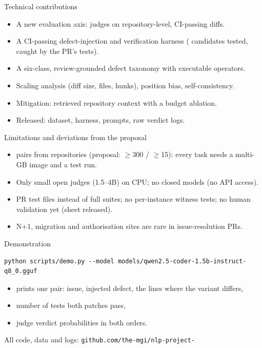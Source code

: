 \documentclass[10pt,aspectratio=169]{beamer}
\begin{document}
\begin{frame}{Technical contributions}
\begin{itemize}
  \item A new evaluation axis: judges on \alert{repository-level, CI-passing} diffs.
  \item A CI-passing defect-injection and verification harness (\NCandidates{} candidates tested, \TestCatchRate{} caught by the PR's tests).
  \item A six-class, review-grounded defect taxonomy with executable operators.
  \item Scaling analysis (diff size, files, hunks), position bias, self-consistency.
  \item Mitigation: retrieved repository context with a budget ablation.
  \item Released: dataset, harness, prompts, raw verdict logs.
\end{itemize}
\end{frame}



\begin{frame}{Limitations and deviations from the proposal}
\begin{itemize}
  \item \NPairs{} pairs from \NRepos{} repositories (proposal: $\geq$300 / $\geq$15): every task needs a multi-GB image and a test run.
  \item Only small open judges (1.5--4B) on CPU; no closed models (no API access).
  \item PR test files instead of full suites; no per-instance witness tests; no human validation yet (sheet released).
  \item N+1, migration and authorisation sites are rare in issue-resolution PRs.
\end{itemize}
\end{frame}

\begin{frame}[fragile]{Demonstration}
\begin{verbatim}
python scripts/demo.py --model models/qwen2.5-coder-1.5b-instruct-q8_0.gguf
\end{verbatim}
\begin{itemize}
  \item prints one pair: issue, injected defect, the lines where the variant differs,
  \item number of tests both patches pass,
  \item judge verdict probabilities in both orders.
\end{itemize}
All code, data and logs: \texttt{github.com/the-mgi/nlp-project-}
\end{frame}
\end{document}
